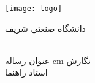 \begin{center}
\thispagestyle{empty}
\texttt{[image: logo]}

\begin{large}
دانشگاه صنعتی شریف \\ \fadepart{}
\vskip 0.8cm
\fatype{} \falevel{} \\ \famajor{}

\end{large}
\vskip 2cm
{\large{عنوان رساله}} 
\vskip 0.5cm
{\titlefont{\textbf{\fatitle}}}
 cm
\large{نگارش} \\ \Large{\faAuthor}
\vskip 0.75cm
\large{استاد راهنما} \\ \Large{\fasupervisor}
\vskip 2cm
\large{\fadate}
\end{center}

